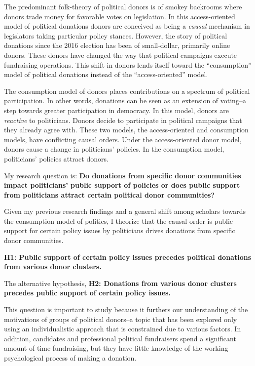 \documentclass[12pt,]{article}
\begin{document}
The predominant folk-theory of political donors is of smokey backrooms
where donors trade money for favorable votes on legislation. In this
access-oriented model of political donations donors are conceived as
being a \emph{causal} mechanism in legislators taking particular policy
stances. However, the story of political donations since the 2016
election has been of small-dollar, primarily online donors. These donors
have changed the way that political campaigns execute fundraising
operations. This shift in donors lends itself toward the ``consumption''
model of political donations instead of the ``access-oriented'' model.

The consumption model of donors places contributions on a spectrum of
political participation. In other words, donations can be seen as an
extension of voting--a step towards greater participation in democracy.
In this model, donors are \emph{reactive} to politicians. Donors decide
to participate in political campaigns that they already agree with.
These two models, the access-oriented and consumption models, have
conflicting causal orders. Under the access-oriented donor model, donors
cause a change in politicians' policies. In the consumption model,
politicians' policies attract donors.

My research question is: \textbf{Do donations from specific donor
communities impact politicians' public support of policies or does
public support from politicians attract certain political donor
communities?}

Given my previous research findings and a general shift among scholars
towards the consumption model of politics, I theorize that the causal
order is public support for certain policy issues by politicians drives
donations from specific donor communities.

\textbf{H1: Public support of certain policy issues precedes political
donations from various donor clusters.}

The alternative hypothesis, \textbf{H2: Donations from various donor
clusters precedes public support of certain policy issues.}

This question is important to study because it furthers our
understanding of the motivations of groups of political donors--a topic
that has been explored only using an individualistic approach that is
constrained due to various factors. In addition, candidates and
professional political fundraisers spend a significant amount of time
fundraising, but they have little knowledge of the working psychological
process of making a donation.
\end{document}
